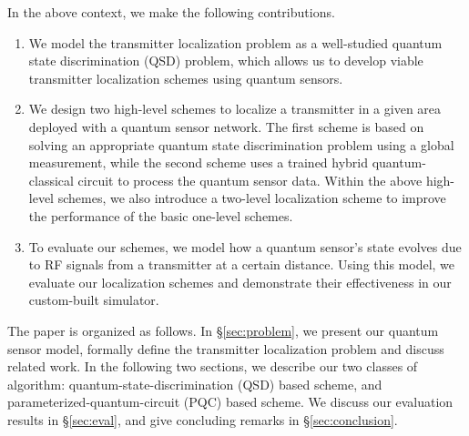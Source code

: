 In the above context, we make the following contributions. 
\begin{enumerate}
    \item We model the transmitter localization problem as a well-studied quantum state discrimination (QSD) problem, which allows us to develop viable transmitter localization schemes using quantum sensors. 
 
    \item 
    We design two high-level schemes to localize a transmitter in a given area deployed with a quantum sensor network.
     The first scheme is based on solving an appropriate quantum state discrimination problem using a global measurement, while the second scheme uses a trained hybrid quantum-classical circuit to process the quantum sensor data. Within the above high-level schemes, we also introduce a two-level localization scheme to improve the performance of the basic one-level schemes.
  
    \item 
    To evaluate our schemes, we model how a quantum sensor's state evolves due to RF signals from a transmitter at a certain distance. Using this model, we 
     evaluate our localization schemes and demonstrate their effectiveness in our custom-built simulator.
\end{enumerate}


 The paper is organized as follows. 
In \S\ref{sec:problem}, we present our quantum sensor model, formally define the transmitter localization problem and discuss related work.
In the following two sections, we describe our two classes of algorithm: quantum-state-discrimination (QSD) based scheme, and parameterized-quantum-circuit (PQC) based scheme.
We discuss our evaluation results in \S\ref{sec:eval}, and give concluding remarks
in \S\ref{sec:conclusion}.
